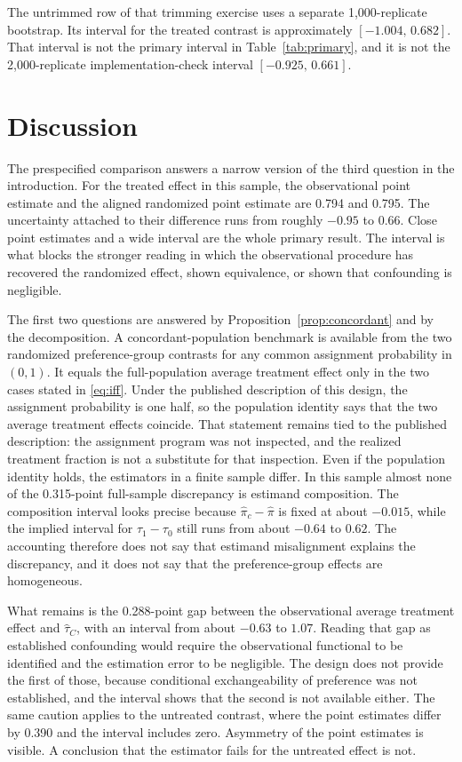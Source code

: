 \documentclass[11pt]{article}
\theoremstyle{remark}
\begin{document}
The untrimmed row of that trimming exercise uses a separate 1{,}000-replicate bootstrap. Its interval for the treated contrast is approximately $[-1.004,\,0.682]$. That interval is not the primary interval in Table~\ref{tab:primary}, and it is not the 2{,}000-replicate implementation-check interval $[-0.925,\,0.661]$.

\section{Discussion}
\label{sec:discussion}

The prespecified comparison answers a narrow version of the third question in the introduction. For the treated effect in this sample, the observational point estimate and the aligned randomized point estimate are 0.794 and 0.795. The uncertainty attached to their difference runs from roughly $-0.95$ to $0.66$. Close point estimates and a wide interval are the whole primary result. The interval is what blocks the stronger reading in which the observational procedure has recovered the randomized effect, shown equivalence, or shown that confounding is negligible.

The first two questions are answered by Proposition~\ref{prop:concordant} and by the decomposition. A concordant-population benchmark is available from the two randomized preference-group contrasts for any common assignment probability in $(0,1)$. It equals the full-population average treatment effect only in the two cases stated in \eqref{eq:iff}. Under the published description of this design, the assignment probability is one half, so the population identity says that the two average treatment effects coincide. That statement remains tied to the published description: the assignment program was not inspected, and the realized treatment fraction is not a substitute for that inspection. Even if the population identity holds, the estimators in a finite sample differ. In this sample almost none of the 0.315-point full-sample discrepancy is estimand composition. The composition interval looks precise because $\widehat\pi_c-\widehat\pi$ is fixed at about $-0.015$, while the implied interval for $\tau_1-\tau_0$ still runs from about $-0.64$ to $0.62$. The accounting therefore does not say that estimand misalignment explains the discrepancy, and it does not say that the preference-group effects are homogeneous.

What remains is the 0.288-point gap between the observational average treatment effect and $\widehat\tau_C$, with an interval from about $-0.63$ to $1.07$. Reading that gap as established confounding would require the observational functional to be identified and the estimation error to be negligible. The design does not provide the first of those, because conditional exchangeability of preference was not established, and the interval shows that the second is not available either. The same caution applies to the untreated contrast, where the point estimates differ by 0.390 and the interval includes zero. Asymmetry of the point estimates is visible. A conclusion that the estimator fails for the untreated effect is not.
\end{document}
